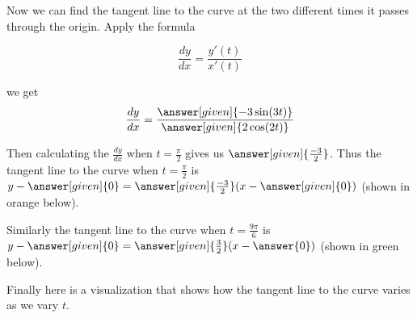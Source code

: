 \documentclass{ximera}
\begin{document}
\begin{example}




 Now we can find the tangent line to the curve at the two different times it passes through the origin. 
Apply the formula 


\[
\frac{dy}{dx} = \frac{ y'(t)}{x'(t)}
\]

we get 
\[
\frac{dy}{dx}=\frac{\answer[given]{-3\sin(3t)}}{\answer[given]{2\cos(2t)}}
\]


Then calculating the $\frac{dy}{dx}$ when $t=\frac{\pi}{2}$ gives us $\answer[given]{ \frac{-3}{2}  }$. Thus the tangent line to the curve when $t=\frac{\pi}{2}$ is 
$y-\answer[given]{ 0}=\answer[given]{\frac{-3}{2}}(x-\answer[given]{0})$ (shown in orange below). 

Similarly the tangent line to the curve when $t=\frac{9\pi}{6}$ is $y-\answer[given]{0}=\answer[given]{\frac{3}{2}  }(x-\answer{0})$ (shown in green below).


\begin{image}
\end{image}



Finally here is a visualization that shows how the tangent line to the curve varies as we vary $t$. 


\end{example}
\end{document}
